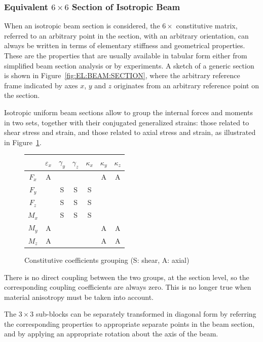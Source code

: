 \subsubsection{Equivalent $6\times6$ Section of Isotropic Beam}
When an isotropic beam section is considered, the $6\times$ 
constitutive matrix, referred to an arbitrary point in the section,
with an arbitrary orientation, can always be written in terms 
of elementary stiffness and geometrical properties.
These are the properties that are usually available in tabular form
either from simplified beam section analysis or by experiments.
A sketch of a generic section is shown
in Figure~\ref{fig:EL:BEAM:SECTION},
where the arbitrary reference frame indicated by axes 
$x$, $y$ and $z$ originates from an arbitrary reference point
on the section.

Isotropic uniform beam sections allow to group the internal forces 
and moments in two sets, together with their conjugated generalized 
strains:
those related to shear stress and strain, and those related 
to axial stress and strain, as illustrated
in Figure~\ref{fig:EL:BEAM:GROUPS}.
\begin{figure}[h]
\centering
\begin{tabular}{c|c|c|c|c|c|c|}
	&
		$\varepsilon_x$ &
		$\gamma_y$ &
		$\gamma_z$ &
		$\kappa_x$ &
		$\kappa_y$ &
		$\kappa_z$ \\
	\hline
	$F_x$ & A &   &   &   & A & A \\
	\hline
	$F_y$ &   & S & S & S &   &   \\
	\hline
	$F_z$ &   & S & S & S &   &   \\
	\hline
	$M_x$ &   & S & S & S &   &   \\
	\hline
	$M_y$ & A &   &   &   & A & A \\
	\hline
	$M_z$ & A &   &   &   & A & A \\
	\hline
\end{tabular}
\caption{Constitutive coefficients grouping (S: shear, A: axial)}
\label{fig:EL:BEAM:GROUPS}
\end{figure}
There is no direct coupling between the two groups, at the section level,
so the corresponding coupling coefficients are always zero.
This is no longer true when material anisotropy must be taken 
into account.

The $3\times3$ sub-blocks can be separately transformed 
in diagonal form by referring the corresponding properties
to appropriate separate points in the beam section, 
and by applying an appropriate rotation about the axis of the beam.



